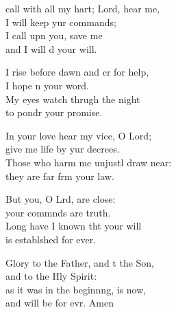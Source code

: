 \settowidth{\versewidth}{I call with all my heart; Lord, hear me, *}
\begin{psalmverse}%
  \begin{patverse}
     call with all my hart; Lord, hear me,\Med\\
I will keep yur commands;\\
I call upn you, save me\Med\\
and I will d your will.

I rise before dawn and cr for help,\Med\\
I hope n your word.\\
My eyes watch thrugh the night\Med\\
to pondr your promise.

In your love hear my vice, O Lord;\Med\\
give me life by yur decrees.\\
Those who harm me unjustl draw near:\Med\\
they are far frm your law.

But you, O Lrd, are close:\Med\\
your commnds are truth.\\
Long have I known tht your will\Med\\
is establshed for ever.

Glory to the Father, and t the Son,\Med\\
and to the Hly Spirit:\\
as it was in the beginn\pointup{\i}ng, is now,\Med\\
and will be for evr. Amen
  \end{patverse}
\end{psalmverse}
